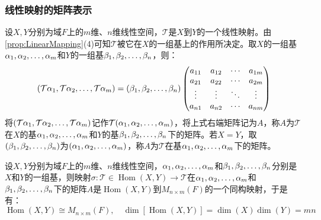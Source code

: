 \subsubsection{线性映射的矩阵表示}
\begin{definition}
	设$X,Y$分别为域$F$上的$m$维、$n$维线性空间，$\mathcal{T}$是$X$到$Y$的一个线性映射。由\cref{prop:LinearMapping}(4)可知$\mathcal{T}$被它在$X$的一组基上的作用所决定。取$X$的一组基$\alpha_1, \alpha_2, \dots, \alpha_{m}$和$Y$的一组基$\beta_1, \beta_2, \dots, \beta_{n}$，则：
	\begin{equation*}
		(\mathcal{T}\alpha_1, \mathcal{T}\alpha_2, \dots, \mathcal{T}\alpha_{m})=(\beta_1, \beta_2, \dots, \beta_{n})
		\begin{pmatrix}
			a_{11} & a_{12} & \cdots & a_{1m} \\
			a_{21} & a_{22} & \cdots & a_{2m} \\
			\vdots & \vdots & \ddots & \vdots \\
			a_{n1} & a_{n2} & \cdots & a_{nm} \\
		\end{pmatrix}
	\end{equation*}
	将$(\mathcal{T}\alpha_1, \mathcal{T}\alpha_2, \dots, \mathcal{T}\alpha_{m})$记作$\mathcal{T}(\alpha_1, \alpha_2, \dots, \alpha_{m})$，将上式右端矩阵记为$A$，称$A$为$\mathcal{T}$在$X$的基$\alpha_1, \alpha_2, \dots, \alpha_{m}$和$Y$的基$\beta_1, \beta_2, \dots, \beta_{n}$下的矩阵。若$X=Y$，取$(\beta_1, \beta_2, \dots, \beta_{n})$为$(\alpha_1, \alpha_2, \dots, \alpha_{m})$，称$A$为$\mathcal{T}$在基$\alpha_1, \alpha_2, \dots, \alpha_{m}$下的矩阵。
\end{definition}
\begin{theorem}\label{theo:LinearTransformationMatrix}
	设$X,Y$分别为域$F$上的$m$维、$n$维线性空间，$\alpha_1, \alpha_2, \dots, \alpha_{m}$和$\beta_1, \beta_2, \dots, \beta_{n}$分别是$X$和$Y$的一组基，则映射$\sigma:\mathcal{T}\in\operatorname{Hom}(X,Y)\longrightarrow\mathcal{T}$在$\alpha_1, \alpha_2, \dots, \alpha_{m}$和$\beta_1, \beta_2, \dots, \beta_{n}$下的矩阵$A$是$\operatorname{Hom}(X,Y)$到$M_{n\times m}(F)$的一个同构映射，于是有：
	\begin{equation*}
		\operatorname{Hom}(X,Y)\cong M_{n\times m}(F),\quad\dim[\operatorname{Hom}(X,Y)]=\dim(X)\dim(Y)=mn
	\end{equation*}
\end{theorem}
